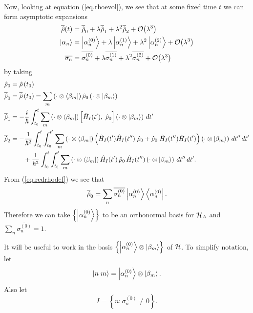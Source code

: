 Now, looking at equation (\ref{eq.rhoevol}), we see that at some fixed time \(t\) we can form asymptotic expansions
\begin{align*}
\overline{\hat{\rho}}(t) &= \overline{\hat{\rho}}_0 + \lambda \overline{\hat{\rho}}_1 + \lambda^2 \overline{\hat{\rho}}_2 + \mathcal{O}{\left(\lambda^3\right)} \\
\left|\alpha_n\right\rangle &= \left|\alpha_n^{(0)}\right\rangle + \lambda \left|\alpha_n^{(1)}\right\rangle + \lambda^2 \left|\alpha_n^{(2)}\right\rangle + \mathcal{O}{\left(\lambda^3\right)} \\
\overline{\sigma_n} &= \overline{\sigma_n^{(0)}} + \lambda \overline{\sigma_n^{(1)}} + \lambda^2 \overline{\sigma_n^{(2)}} + \mathcal{O}{\left(\lambda^3\right)}
\end{align*}
by taking
\begin{align}
\nonumber\hat{\rho}_0 &= \hat{\rho}\left(t_0\right) \\
\nonumber\overline{\hat{\rho}}_0 &= \overline{\hat{\rho}}\left(t_0\right) =  \sum_m \left(\cdot\otimes\left\langle\beta_m\right|\right) \hat{\rho}_0 \left(\cdot\otimes\left|\beta_m\right\rangle\right) \\
\label{eq.rho1red}\overline{\hat{\rho}}_1 &= -\frac{i}{\hbar} \int_{t_0}^t \sum_m \left(\cdot\otimes\left\langle\beta_m\right|\right) \left[\hat{H}_I(t^\prime),\; \hat{\rho}_0 \right]\left(\cdot\otimes\left|\beta_m\right\rangle\right) \,dt^\prime\\
\label{eq.rho2red}\overline{\hat{\rho}}_2 &= - \frac{1}{\hbar^2} \int_{t_0}^t \int_{t_0}^{t^\prime} \sum_m \left(\cdot\otimes\left\langle\beta_m\right|\right) \left( \hat{H}_I (t^\prime) \hat{H}_I(t^{\prime\prime}) \;\hat{\rho}_0 + \hat{\rho}_0\; \hat{H}_I (t^{\prime\prime}) \hat{H}_I(t^{\prime}) \right)\left(\cdot\otimes\left|\beta_m\right\rangle\right)\,dt^{\prime\prime}\,dt^\prime \\
\nonumber&\hspace{2em}+ \frac{1}{\hbar^2} \int_{t_0}^t \int_{t_0}^{t} \sum_m \left(\cdot\otimes\left\langle\beta_m\right|\right) \hat{H}_I (t^\prime) \,\hat{\rho}_0\, \hat{H}_I (t^{\prime\prime})\left(\cdot\otimes\left|\beta_m\right\rangle\right)\,dt^{\prime\prime}\,dt^\prime.
\end{align}
From (\ref{eq.redrhodef}) we see that
\begin{equation}\label{eq.rho0red}
\overline{\hat{\rho}}_0 = \sum_n \overline{\sigma_{n}^{(0)}} \left|\alpha_n^{(0)}\right\rangle\left\langle\alpha_n^{(0)}\right|.
\end{equation}
Therefore we can take \(\left\{\left|\alpha_n^{(0)}\right\rangle\right\}\) to be an orthonormal basis for \(\mathcal{H}_A\) and \(\sum_n \overline{\sigma_n^{(0)}} = 1\).

It will be useful to work in the basis \(\left\{\left|\alpha_n^{(0)}\right\rangle\otimes\left|\beta_m\right\rangle\right\}\) of \(\mathcal{H}\). To simplify notation, let
\[
\left|n\;m\right\rangle = \left|\alpha_n^{(0)}\right\rangle\otimes\left|\beta_m\right\rangle.
\]
Also let
\[
I = \left\{n : \overline{\sigma_n^{(0)}} \neq 0\right\}.
\]

